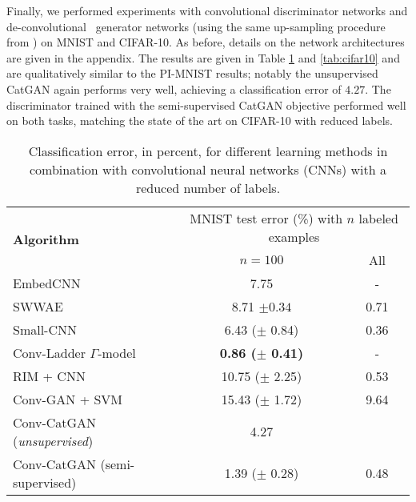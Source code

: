 \documentclass{article} \usepackage{iclr2016_conference,times}
\begin{document}
Finally, we performed experiments with convolutional discriminator
networks and de-convolutional~\citep{Zeiler_ICCV2011} generator
networks (using the same up-sampling procedure from
\citet{DosSprChair15}) on MNIST and CIFAR-10. As before, details on
the network architectures are given in the appendix. The results are
given in Table \ref{tab:cnn_mnist} and \ref{tab:cifar10} and are
qualitatively similar to the PI-MNIST results; notably the
unsupervised CatGAN again performs very well, achieving a classification error
of $4.27$. The discriminator trained with the semi-supervised CatGAN
objective performed well on both tasks, matching the state of the art
on CIFAR-10 with reduced labels.

\begin{table}
  \begin{tabular}{lcc}
    \multirow{2}{*}{\bf Algorithm} & \multicolumn{2}{c}{MNIST test error (\%) with $n$ labeled examples} \\
                                   & $n = 100$ & All \\
    \hline
    EmbedCNN \citep{Weston_2012} & 7.75 & - \\
    SWWAE \citep{Zhao_2015} & 8.71 $\pm 0.34$ & 0.71 \\
    Small-CNN \citep{Rasmus_NIPS2015} & 6.43 ($\pm$ 0.84) & 0.36 \\
    Conv-Ladder $\Gamma$-model \citep{Rasmus_NIPS2015} & \textbf{0.86 ($\pm$ 0.41)} & - \\
    \hline
    RIM + CNN & 10.75 ($\pm$ 2.25) & 0.53  \\
    Conv-GAN + SVM & 15.43 ($\pm$ 1.72) & 9.64 \\
    Conv-CatGAN (\emph{unsupervised}) & 4.27  &  \\
    Conv-CatGAN (semi-supervised) & 1.39 ($\pm$ 0.28) & 0.48 \\
  \end{tabular}
  \caption{Classification error, in percent, for different learning methods in combination with convolutional neural networks (CNNs) with a reduced number of labels.}
  \label{tab:cnn_mnist}
\end{table}
\end{document}
